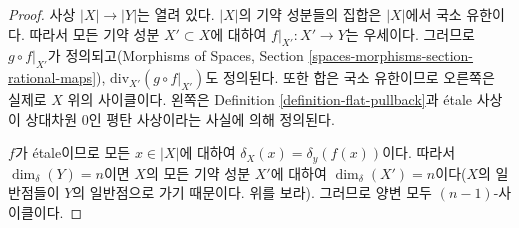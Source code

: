 \begin{proof}
사상 $|X| \to |Y|$는 열려 있다. $|X|$의 기약 성분들의 집합은
$|X|$에서 국소 유한이다. 따라서 모든 기약 성분 $X' \subset X$에
대하여 $f|_{X'} : X' \to Y$는 우세이다. 그러므로
$g \circ f|_{X'}$가 정의되고(Morphisms of Spaces, Section
\ref{spaces-morphisms-section-rational-maps}),
$\text{div}_{X'}(g \circ f|_{X'})$도 정의된다. 또한 합은 국소
유한이므로 오른쪽은 실제로 $X$ 위의 사이클이다. 왼쪽은 Definition
\ref{definition-flat-pullback}과 \'etale 사상이 상대차원 $0$인
평탄 사상이라는 사실에 의해 정의된다.

\medskip\noindent
$f$가 \'etale이므로 모든 $x \in |X|$에 대하여
$\delta_X(x) = \delta_y(f(x))$이다. 따라서
$\dim_\delta(Y) = n$이면 $X$의 모든 기약 성분 $X'$에 대하여
$\dim_\delta(X') = n$이다($X$의 일반점들이 $Y$의 일반점으로 가기
때문이다. 위를 보라). 그러므로 양변 모두 $(n - 1)$-사이클이다.


\end{proof}
